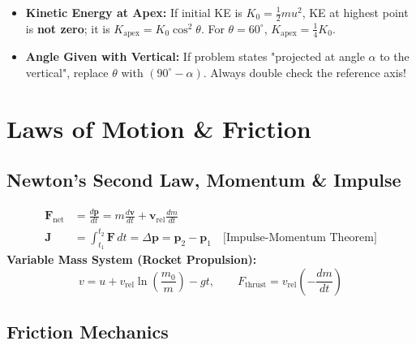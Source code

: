 \documentclass[10pt,twoside,openright]{book}
\begin{document}
\begin{trapbox}
\begin{itemize}
  \item \textbf{Kinetic Energy at Apex:} If initial KE is $K_0 = \frac{1}{2}mu^2$, KE at highest point is \textbf{not zero}; it is $K_{\text{apex}} = K_0 \cos^2\theta$. For $\theta=60^\circ$, $K_{\text{apex}} = \frac{1}{4}K_0$.
  \item \textbf{Angle Given with Vertical:} If problem states "projected at angle $\alpha$ to the vertical", replace $\theta$ with $(90^\circ - \alpha)$. Always double check the reference axis!
\end{itemize}
\end{trapbox}

\newpage

\section{Laws of Motion \& Friction}

\subsection{Newton's Second Law, Momentum \& Impulse}

\begin{formulabox}
\begin{align}
  \mathbf{F}_{\text{net}} &= \frac{d\mathbf{p}}{dt} = m\frac{d\mathbf{v}}{dt} + \mathbf{v}_{\text{rel}}\frac{dm}{dt} \\
  \mathbf{J} &= \int_{t_1}^{t_2} \mathbf{F}\,dt = \Delta\mathbf{p} = \mathbf{p}_2 - \mathbf{p}_1 \quad \text{[Impulse-Momentum Theorem]}
\end{align}
\textbf{Variable Mass System (Rocket Propulsion):}
\begin{equation}
  v = u + v_{\text{rel}}\ln\left(\frac{m_0}{m}\right) - gt, \qquad F_{\text{thrust}} = v_{\text{rel}}\left(-\frac{dm}{dt}\right)
\end{equation}
\end{formulabox}

\subsection{Friction Mechanics}
\end{document}
